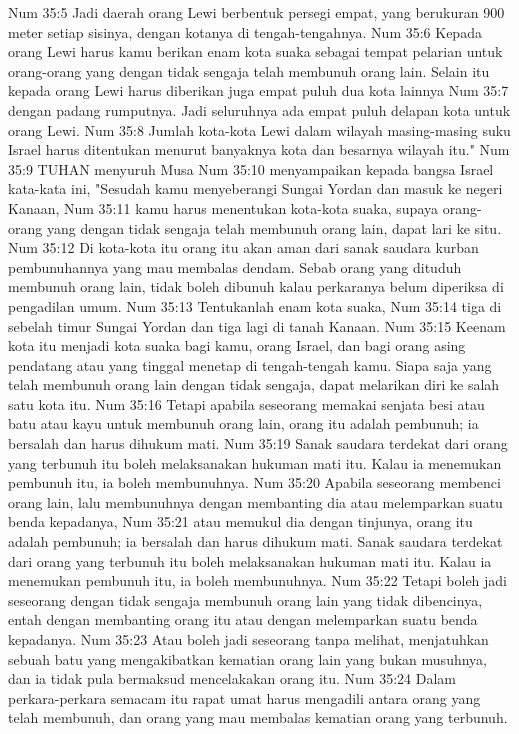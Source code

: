 Num 35:5  Jadi daerah orang Lewi berbentuk persegi empat, yang berukuran 900 meter setiap sisinya, dengan kotanya di tengah-tengahnya.
Num 35:6  Kepada orang Lewi harus kamu berikan enam kota suaka sebagai tempat pelarian untuk orang-orang yang dengan tidak sengaja telah membunuh orang lain. Selain itu kepada orang Lewi harus diberikan juga empat puluh dua kota lainnya
Num 35:7  dengan padang rumputnya. Jadi seluruhnya ada empat puluh delapan kota untuk orang Lewi.
Num 35:8  Jumlah kota-kota Lewi dalam wilayah masing-masing suku Israel harus ditentukan menurut banyaknya kota dan besarnya wilayah itu."
Num 35:9  TUHAN menyuruh Musa
Num 35:10  menyampaikan kepada bangsa Israel kata-kata ini, "Sesudah kamu menyeberangi Sungai Yordan dan masuk ke negeri Kanaan,
Num 35:11  kamu harus menentukan kota-kota suaka, supaya orang-orang yang dengan tidak sengaja telah membunuh orang lain, dapat lari ke situ.
Num 35:12  Di kota-kota itu orang itu akan aman dari sanak saudara kurban pembunuhannya yang mau membalas dendam. Sebab orang yang dituduh membunuh orang lain, tidak boleh dibunuh kalau perkaranya belum diperiksa di pengadilan umum.
Num 35:13  Tentukanlah enam kota suaka,
Num 35:14  tiga di sebelah timur Sungai Yordan dan tiga lagi di tanah Kanaan.
Num 35:15  Keenam kota itu menjadi kota suaka bagi kamu, orang Israel, dan bagi orang asing pendatang atau yang tinggal menetap di tengah-tengah kamu. Siapa saja yang telah membunuh orang lain dengan tidak sengaja, dapat melarikan diri ke salah satu kota itu.
Num 35:16  Tetapi apabila seseorang memakai senjata besi atau batu atau kayu untuk membunuh orang lain, orang itu adalah pembunuh; ia bersalah dan harus dihukum mati.
Num 35:19  Sanak saudara terdekat dari orang yang terbunuh itu boleh melaksanakan hukuman mati itu. Kalau ia menemukan pembunuh itu, ia boleh membunuhnya.
Num 35:20  Apabila seseorang membenci orang lain, lalu membunuhnya dengan membanting dia atau melemparkan suatu benda kepadanya,
Num 35:21  atau memukul dia dengan tinjunya, orang itu adalah pembunuh; ia bersalah dan harus dihukum mati. Sanak saudara terdekat dari orang yang terbunuh itu boleh melaksanakan hukuman mati itu. Kalau ia menemukan pembunuh itu, ia boleh membunuhnya.
Num 35:22  Tetapi boleh jadi seseorang dengan tidak sengaja membunuh orang lain yang tidak dibencinya, entah dengan membanting orang itu atau dengan melemparkan suatu benda kepadanya.
Num 35:23  Atau boleh jadi seseorang tanpa melihat, menjatuhkan sebuah batu yang mengakibatkan kematian orang lain yang bukan musuhnya, dan ia tidak pula bermaksud mencelakakan orang itu.
Num 35:24  Dalam perkara-perkara semacam itu rapat umat harus mengadili antara orang yang telah membunuh, dan orang yang mau membalas kematian orang yang terbunuh.
